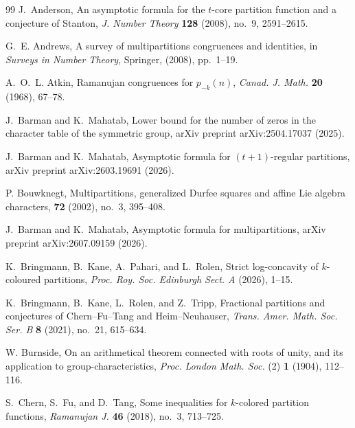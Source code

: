 \documentclass[11pt]{amsart}
\theoremstyle{plain}
\numberwithin{equation}{section}
\begin{document}
	\begin{thebibliography}{99}
		J.~Anderson,
		\newblock An asymptotic formula for the $t$-core partition function and a conjecture of Stanton,
		\newblock \emph{J. Number Theory} \textbf{128} (2008), no.~9, 2591--2615.
		
		G.~E. Andrews,
		\newblock A survey of multipartitions congruences and identities,
		\newblock in \emph{Surveys in Number Theory},
		Springer, (2008), pp.~1--19.
		
		A.~O.~L. Atkin,
		\newblock Ramanujan congruences for $p_{-k}(n)$,
		\newblock \emph{Canad. J. Math.} \textbf{20} (1968), 67--78.
		
		J.~Barman and K.~Mahatab,
		\newblock Lower bound for the number of zeros in the character table of the
		symmetric group,
		\newblock arXiv preprint arXiv:2504.17037 (2025).
		
		J.~Barman and K.~Mahatab,
		\newblock Asymptotic formula for $(t+1)$-regular partitions,
		\newblock arXiv preprint arXiv:2603.19691 (2026).
		
		P. Bouwknegt,
		\newblock Multipartitions, generalized Durfee squares and affine Lie algebra characters,
		 {\bf 72} (2002), no.~3, 395--408.
		
		J.~Barman and K.~Mahatab,
		\newblock Asymptotic formula for multipartitions,
		\newblock arXiv preprint arXiv:2607.09159 (2026).
		
		K.~Bringmann, B.~Kane, A.~Pahari, and L.~Rolen,
		\newblock Strict log-concavity of $k$-coloured partitions,
		\newblock \emph{Proc. Roy. Soc. Edinburgh Sect. A} (2026), 1--15.
		
		
		K.~Bringmann, B.~Kane, L.~Rolen, and Z.~Tripp,
		\newblock Fractional partitions and conjectures of Chern--Fu--Tang and Heim--Neuhauser,
		\newblock \emph{Trans. Amer. Math. Soc. Ser. B} \textbf{8} (2021), no.~21, 615--634.
		
		W. Burnside,
		On an arithmetical theorem connected with roots of unity, and its
		application to group-characteristics,
		\emph{Proc. London Math. Soc.} (2) \textbf{1} (1904), 112--116.
		
		S.~Chern, S.~Fu, and D.~Tang,
		\newblock Some inequalities for $k$-colored partition functions,
		\newblock \emph{Ramanujan J.} \textbf{46} (2018), no.~3, 713--725.
		

\end{thebibliography}
\end{document}
